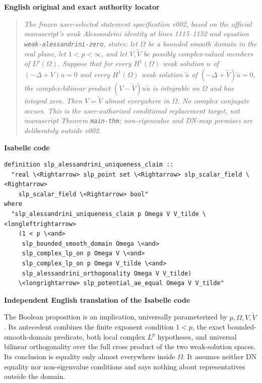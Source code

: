 \documentclass[10pt,oneside]{article}
\newenvironment{sourcequote}{\begin{quote}\itshape}{\end{quote}}
\newcommand{\reviewlabel}[1]{\par\smallskip\noindent\textsf{\bfseries #1}\par\smallskip}
\begin{document}
\reviewlabel{English original and exact authority locator}
\begin{sourcequote}
The frozen user-selected statement specification v002, based on the official
manuscript's weak Alessandrini identity at lines 1115--1152 and equation
\texttt{weak-alessandrini-zero}, states: let $\Omega$ be a bounded smooth
domain in the real plane, let $1<p<\infty$, and let $V,\widetilde V$ be
possibly complex-valued members of $L^p(\Omega)$. Suppose that for every
$H^1(\Omega)$ weak solution $u$ of $(-\Delta+V)u=0$ and every
$H^1(\Omega)$ weak solution $\widetilde u$ of
$(-\Delta+\widetilde V)\widetilde u=0$, the complex-bilinear product
$(V-\widetilde V)u\widetilde u$ is integrable on $\Omega$ and has integral
zero. Then $V=\widetilde V$ almost everywhere in $\Omega$. No complex
conjugate occurs. This is the user-authorized conditional replacement target,
not manuscript Theorem \texttt{main-thm}; non-eigenvalue and DN-map premises
are deliberately outside v002.
\end{sourcequote}

\reviewlabel{Isabelle code}
\begin{lstlisting}
definition slp_alessandrini_uniqueness_claim ::
  "real \<Rightarrow> slp_point set \<Rightarrow> slp_scalar_field \<Rightarrow>
    slp_scalar_field \<Rightarrow> bool"
where
  "slp_alessandrini_uniqueness_claim p Omega V V_tilde \<longleftrightarrow>
    (1 < p \<and>
     slp_bounded_smooth_domain Omega \<and>
     slp_complex_lp_on p Omega V \<and>
     slp_complex_lp_on p Omega V_tilde \<and>
     slp_alessandrini_orthogonality Omega V V_tilde)
    \<longrightarrow> slp_potential_ae_equal Omega V V_tilde"
\end{lstlisting}

\reviewlabel{Independent English translation of the Isabelle code}
The Boolean proposition is an implication, universally parameterized by
$p,\Omega,V,\widetilde V$. Its antecedent combines the finite exponent
condition $1<p$, the exact bounded-smooth-domain predicate, both local complex
$L^p$ hypotheses, and universal bilinear orthogonality over the full cross
product of the two weak-solution spaces. Its conclusion is equality only
almost everywhere inside $\Omega$. It assumes neither DN equality nor
non-eigenvalue conditions and says nothing about representatives outside the
domain.
\end{document}
